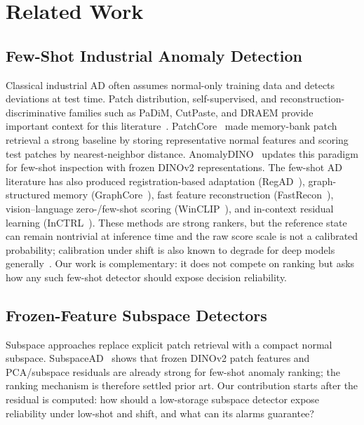 \section{Related Work}\label{sec:related}
\subsection{Few-Shot Industrial Anomaly Detection}
Classical industrial AD often assumes normal-only training data and detects deviations at test time. Patch distribution, self-supervised, and reconstruction-discriminative families such as PaDiM, CutPaste, and DRAEM provide important context for this literature~\cite{padim2021,cutpaste2021,draem2021}. PatchCore~\cite{patchcore2021} made memory-bank patch retrieval a strong baseline by storing representative normal features and scoring test patches by nearest-neighbor distance. AnomalyDINO~\cite{anomalydino2024} updates this paradigm for few-shot inspection with frozen DINOv2 representations. The few-shot AD literature has also produced registration-based adaptation (RegAD~\cite{regad2022}), graph-structured memory (GraphCore~\cite{graphcore2023}), fast feature reconstruction (FastRecon~\cite{fastrecon2023}), vision--language zero-/few-shot scoring (WinCLIP~\cite{winclip2023}), and in-context residual learning (InCTRL~\cite{inctrl2024}). These methods are strong rankers, but the reference state can remain nontrivial at inference time and the raw score scale is not a calibrated probability; calibration under shift is also known to degrade for deep models generally~\cite{ovadia2019trust}. Our work is complementary: it does not compete on ranking but asks how any such few-shot detector should expose decision reliability.

\subsection{Frozen-Feature Subspace Detectors}
Subspace approaches replace explicit patch retrieval with a compact normal subspace. SubspaceAD~\cite{subspacead2026} shows that frozen DINOv2 patch features and PCA/subspace residuals are already strong for few-shot anomaly ranking; the ranking mechanism is therefore settled prior art. Our contribution starts after the residual is computed: how should a low-storage subspace detector expose reliability under low-shot and shift, and what can its alarms guarantee?

